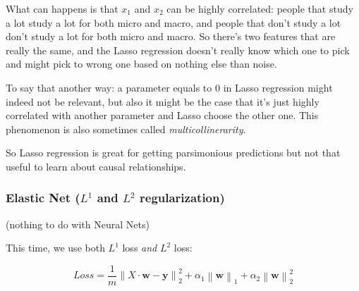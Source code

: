 \documentclass{article}
\theoremstyle{problemstyle}
\begin{document}
What can happens is that $x_1$ and $x_2$ can be highly correlated: people that study a lot study a lot for both micro and macro, and people that don't study a lot don't study a lot for both micro and macro. So there's two features that are really the same, and the Lasso regression doesn't really know which one to pick and might pick to wrong one based on nothing else than noise. 

To say that another way: a parameter equals to 0 in Lasso regression might indeed not be relevant, but also it might be the case that it's just highly correlated with another parameter and Lasso choose the other one. This phenomenon is also sometimes called \emph{multicollinerarity}.

So Lasso regression is great for getting parsimonious predictions but not that useful to learn about causal relationships. 

\subsubsection{Elastic Net ($L^1$ and $L^2$ regularization)}

(nothing to do with Neural Nets)

This time, we use both $L^1$ loss \emph{and} $L^2$ loss: 

\[
  Loss = \frac{1}{m} \left\lVert X \cdot \textbf{w} - \textbf{y} \right\rVert_2 ^{2} + \alpha_1 \left\lVert \textbf{w} \right\rVert_1 + \alpha_2 \left\lVert \textbf{w} \right\rVert_2 ^{2}
\]
\end{document}
